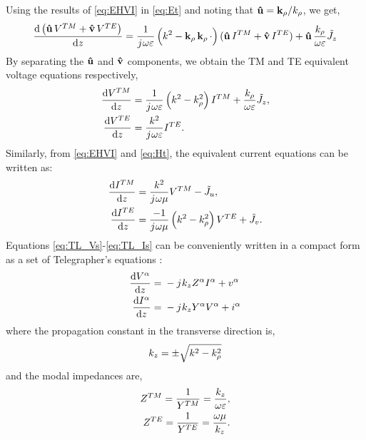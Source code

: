 \documentclass[12pt]{article}
\begin{document}
%
Using the results of \eqref{eq:EHVI} in \eqref{eq:Et} and noting that $\mathbf{\hat u} = \mathbf{k_{\rho}}/k_{\rho}$, we get,
%
\begin{equation}
  \dv{\left(\mathbf{\hat u} \, V^{TM} + \mathbf{\hat v} \,V^{TE} \right)}{z} = \frac{1}{j\mkern1mu \omega \varepsilon}\left( k^2 - \mathbf{k_{\rho}} \,\mathbf{k_{\rho}} \,\cdot \right) (\mathbf{\hat u}\, I^{TM} + \mathbf{\hat v} \, I^{TE}) + \mathbf{\hat u} \, \frac{k_{\rho}}{\omega \varepsilon} \tilde{J}_z
  \label{eq:Vinuv}
\end{equation}
%
By separating the $\mathbf{\hat u}$ and $\mathbf{\hat v}$ components, we obtain the TM and TE equivalent voltage equations respectively,
%
\begin{subequations}
  \begin{align}
    \dv{V^{TM}}{z} ={}&
    \frac{1}{j\mkern1mu \omega \varepsilon}\left( k^2 - k_{\rho}^2 \right)I^{TM} + \frac{k_{\rho}}{\omega \varepsilon} \tilde{J}_z,
    \label{eq:V_TM}\\
    \dv{V^{TE}}{z} ={}&
    \frac{k^2}{j\mkern1mu \omega \varepsilon} I^{TE}.
    \label{eq:V_TE}
  \end{align}
  \label{eq:TL_Vs}%
\end{subequations}
%
Similarly, from \eqref{eq:EHVI} and \eqref{eq:Ht}, the equivalent current equations can be written as:
%
\begin{subequations}
  \begin{align}
    \dv{I^{TM}}{z} ={}&
    \frac{k^2}{j\mkern1mu \omega \mu} V^{TM} - \tilde{J}_u,
    \label{eq:I_TM}\\
    \dv{I^{TE}}{z} ={}&
    \frac{-1}{j\mkern1mu \omega \mu}\left( k^2 - k_{\rho}^2 \right)V^{TE} + \tilde{J}_v.
    \label{eq:I_TE}
  \end{align}
  \label{eq:TL_Is}%
\end{subequations}
%
Equations \eqref{eq:TL_Vs}-\eqref{eq:TL_Is} can be conveniently written in a compact form as a set of Telegrapher's equations \cite[p. 1166]{michalski2005}:
%
\begin{subequations}
  \begin{align}
    \dv{V^{\alpha}}{z} ={}& -j\mkern1mu k_z Z^{\alpha}I^{\alpha} + v^{\alpha}
    \label{eq:TL_V}\\
    \dv{I^{\alpha}}{z} ={}& -j\mkern1mu k_z Y^{\alpha}V^{\alpha} + i^{\alpha}
    \label{eq:TL_I}
  \end{align}
  \label{eq:TLE}%
\end{subequations}
%
where the propagation constant in the transverse direction is,
%
\begin{equation}
  k_z = \pm \sqrt{k^2 - k_{\rho}^2}
  \label{eq:k_z}
\end{equation}
%
and the modal impedances are,
%
\begin{subequations}
  \begin{align}
    Z^{TM} = \frac{1}{Y^{TM}} = \frac{k_z}{\omega \varepsilon},
    \label{eq:z_tm}\\
    Z^{TE} = \frac{1}{Y^{TE}} = \frac{\omega \mu}{k_z}.
    \label{eq:z_te}
  \end{align}
  \label{eq:Z}%
\end{subequations}
\end{document}
